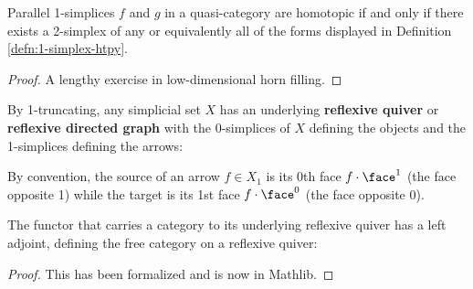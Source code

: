    \begin{lemma}\label{lem:qcat-1-simplex-htpy}
    Parallel 1-sim\-plices $f$ and $g$ in a quasi-category are homotopic if and only if there exists a 2-simplex of any or equivalently all of the forms displayed in Definition \ref{defn:1-simplex-htpy}.
   \end{lemma}
 \begin{proof}
   A lengthy exercise in low-dimensional horn filling.
   \end{proof}

\begin{definition}\label{defn:one-truncation}
  \leanok
  By 1-truncating, any simplicial set $X$ has an underlying \textbf{reflexive quiver} or \textbf{reflexive directed graph} with the 0-simplices of $X$ defining the objects and the 1-simplices defining the arrows:
  \begin{center}
  \end{center}
  By convention, the source of an arrow $f \in X_1$ is its 0th face $f \cdot \face^1$ (the face opposite 1) while the target is its 1st face $f \cdot \face^0$ (the face opposite 0).
\end{definition}

\begin{proposition}\label{prop:free-refl-quiver}
  \leanok
The functor that carries a category to its underlying reflexive quiver has a left adjoint, defining the free category on a reflexive quiver:
\begin{center}
  \end{center}
\end{proposition}
\begin{proof}
  \leanok
This has been formalized and is now in Mathlib.
\end{proof}

